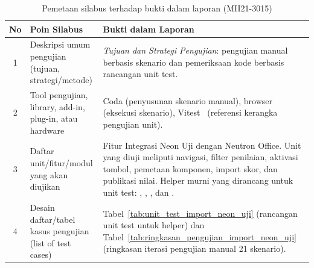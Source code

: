 \begin{table}[htbp]
	\centering
	\caption{Pemetaan silabus terhadap bukti dalam laporan (MII21-3015)}
	\label{tab:pemetaan_silabus_bab4}
	\begin{tabularx}{\textwidth}{|c|>{\raggedright\arraybackslash}p{5cm}|>{\raggedright\arraybackslash}X|}
		\hline
		\textbf{No} & \textbf{Poin Silabus}                                       & \textbf{Bukti dalam Laporan}                                                                                                                                                                                                                                                                                                                                                \\
		\hline
		1           & Deskripsi umum pengujian (tujuan, strategi/metode)          & \emph{Tujuan dan Strategi Pengujian}: pengujian manual berbasis skenario dan pemeriksaan kode berbasis rancangan unit test.                                                                                                                                                                                                                                                 \\
		\hline
		2           & Tool pengujian, library, add-in, plug-in, atau hardware     & Coda (penyusunan skenario manual), browser (eksekusi skenario), Vitest~\cite{vitest_docs} (referensi kerangka pengujian unit).                                                                                                                                                                                                                                              \\
		\hline
		3           & Daftar unit/fitur/modul yang akan diujikan                  & Fitur Integrasi Neon Uji dengan Neutron Office. Unit yang diuji meliputi navigasi, filter penilaian, aktivasi tombol, pemetaan komponen, import skor, dan publikasi nilai. Helper murni yang dirancang untuk unit test: \code{canProceedImportNeonUji}, \code{resetImportNeonUjiFiltersFromField}, \code{normalizeImportNeonUjiTargetIds}, dan \code{selectImportNeonUjiScore}. \\
		\hline
		4           & Desain daftar/tabel kasus pengujian (list of test cases)    & Tabel~\ref{tab:unit_test_import_neon_uji} (rancangan unit test untuk helper) dan Tabel~\ref{tab:ringkasan_pengujian_import_neon_uji} (ringkasan iterasi pengujian manual 21 skenario).                                                                                                                                                                                      \\

\end{tabularx}
\end{table}
